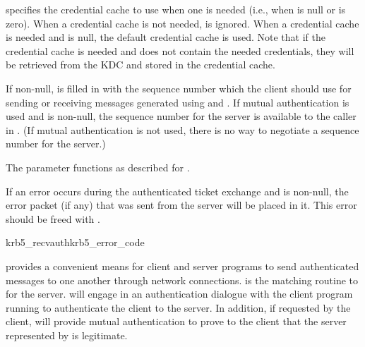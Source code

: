  specifies the credential cache to use when one is
needed (i.e., when  is null or
 is zero).  When a credential
cache is not needed,  is ignored.  When a credential
cache is needed and  is null, the default credential
cache is used.  Note that if the credential cache is needed and does
not contain the needed credentials, they will be retrieved from the
KDC and stored in the credential cache.

If non-null,  is filled in with the sequence number
which the client should use for sending or receiving messages generated
using  and .  If mutual
authentication is used and  is non-null, the
sequence number for the server is available to the caller in
.  (If mutual authentication is not
used, there is no way to negotiate a sequence number for the server.)

The  parameter functions as described for
.

If an error occurs during the authenticated ticket exchange and
 is non-null, the error packet (if any) that was sent
from the server will be placed in it.  This error should be freed with
.

\begin{funcdecl}{krb5_recvauth}{krb5_error_code}
\funcin
{}
\funcendfuncarg
{}
\funcout
{}
\end{funcdecl}

 provides a convenient means for client and
server programs to send authenticated messages to one another through
network connections.   is the matching routine
to  for the server.  
will engage in an authentication dialogue with the
client program running  to authenticate the
client to the server.  In addition, if requested by the client,
 will provide mutual authentication to
prove to the client that the server represented by
 is legitimate. 

